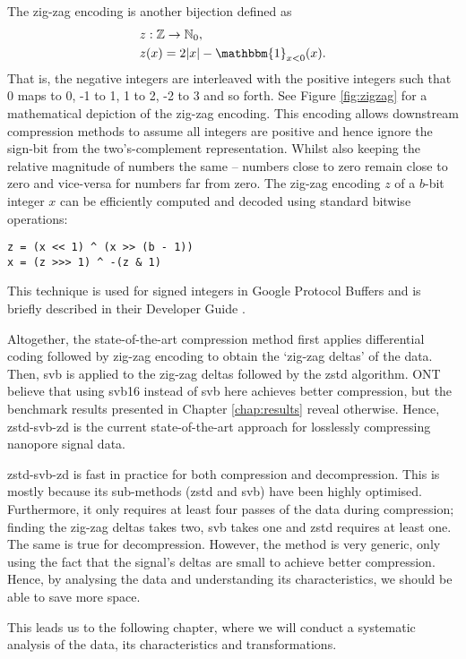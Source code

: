 The zig-zag encoding is another bijection defined as
\begin{align*}
	z&:\mathbb{Z}\to\mathbb{N}_0,\\
	z&(x)=2|x|-\mathbbm{1}_{x<0}(x).
\end{align*}
That is, the negative integers are interleaved with the positive integers such that 0 maps to 0, -1 to 1, 1 to 2, -2 to 3 and so forth.
See Figure \ref{fig:zigzag} for a mathematical depiction of the zig-zag encoding.
This encoding allows downstream compression methods to assume all integers are positive and hence ignore the sign-bit from the two's-complement representation.
Whilst also keeping the relative magnitude of numbers the same -- numbers close to zero remain close to zero and vice-versa for numbers far from zero.
The zig-zag encoding $z$ of a $b$-bit integer $x$ can be efficiently computed and decoded using standard bitwise operations:
\begin{lstlisting}
z = (x << 1) ^ (x >> (b - 1))
x = (z >>> 1) ^ -(z & 1)
\end{lstlisting}
This technique is used for signed integers in Google Protocol Buffers and is briefly described in their Developer Guide \cite{google-zigzag}.



Altogether, the state-of-the-art compression method first applies differential
coding followed by zig-zag encoding to obtain the `zig-zag deltas' of the data.
Then, svb is applied to the zig-zag deltas followed by the zstd algorithm. ONT
believe that using svb16 instead of svb here achieves better compression, but the
benchmark results presented in Chapter \ref{chap:results} reveal otherwise.
Hence, zstd-svb-zd is the current state-of-the-art approach for losslessly
compressing nanopore signal data.

zstd-svb-zd is fast in practice for both compression and decompression. This is
mostly because its sub-methods (zstd and svb) have been highly optimised.
Furthermore, it only requires at least four passes of the data during
compression; finding the zig-zag deltas takes two, svb takes one and zstd
requires at least one. The same is true for decompression. However, the method
is very generic, only using the fact that the signal's deltas are small to
achieve better compression. Hence, by analysing the data and understanding its
characteristics, we should be able to save more space.

This leads us to the following chapter, where we will conduct a systematic
analysis of the data, its characteristics and transformations.
